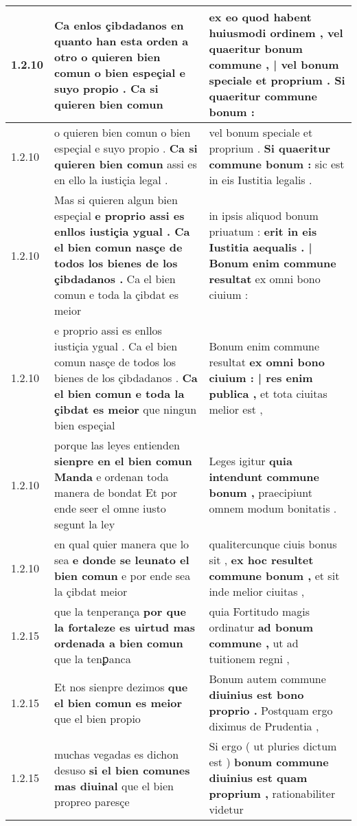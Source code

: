 \begin{tabular}{|p{1cm}|p{6.5cm}|p{6.5cm}|}
1.2.10 & Ca enlos çibdadanos en quanto han esta orden a otro \textbf{ o quieren bien comun o bien espeçial e suyo propio . } Ca si quieren bien comun & ex eo quod habent huiusmodi ordinem , \textbf{ vel quaeritur bonum commune , | vel bonum speciale et proprium . } Si quaeritur commune bonum : \\\hline
1.2.10 & o quieren bien comun o bien espeçial e suyo propio . \textbf{ Ca si quieren bien comun } assi es en ello la iustiçia legal . & vel bonum speciale et proprium . \textbf{ Si quaeritur commune bonum : } sic est in eis Iustitia legalis . \\\hline
1.2.10 & Mas si quieren algun bien espeçial \textbf{ e proprio assi es enllos iustiçia ygual . Ca el bien comun nasçe de todos los bienes de los çibdadanos . } Ca el bien comun e toda la çibdat es meior & in ipsis aliquod bonum priuatum : \textbf{ erit in eis Iustitia aequalis . | Bonum enim commune resultat } ex omni bono ciuium : \\\hline
1.2.10 & e proprio assi es enllos iustiçia ygual . Ca el bien comun nasçe de todos los bienes de los çibdadanos . \textbf{ Ca el bien comun e toda la çibdat es meior } que ningun bien espeçial & Bonum enim commune resultat \textbf{ ex omni bono ciuium : | res enim publica , } et tota ciuitas melior est , \\\hline
1.2.10 & porque las leyes entienden \textbf{ sienpre en el bien comun Manda } e ordenan toda manera de bondat Et por ende seer el omne iusto segunt la ley & Leges igitur \textbf{ quia intendunt commune bonum , } praecipiunt omnem modum bonitatis . \\\hline
1.2.10 & en qual quier manera que lo sea \textbf{ e donde se leunato el bien comun } e por ende sea la çibdat meior & qualitercunque ciuis bonus sit , \textbf{ ex hoc resultet commune bonum , } et sit inde melior ciuitas , \\\hline
1.2.15 & que la tenperança \textbf{ por que la fortaleze es uirtud mas ordenada a bien comun } que la tenꝑanca & quia Fortitudo magis ordinatur \textbf{ ad bonum commune , } ut ad tuitionem regni , \\\hline
1.2.15 & Et nos sienpre dezimos \textbf{ que el bien comun es meior } que el bien propio & Bonum autem commune \textbf{ diuinius est bono proprio . } Postquam ergo diximus de Prudentia , \\\hline
1.2.15 & muchas vegadas es dichon desuso \textbf{ si el bien comunes mas diuinal } que el bien propreo paresçe & Si ergo ( ut pluries dictum est ) \textbf{ bonum commune diuinius est quam proprium , } rationabiliter videtur \\\hline

\end{tabular}
